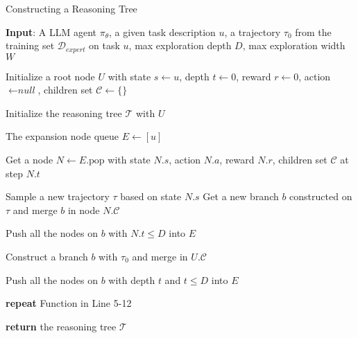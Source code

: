 \begin{algorithm*}[tb]
\caption{Constructing a Reasoning Tree}\label{algo:stage2}
\begin{algorithmic}
 \STATE \textbf{Input}: A LLM agent $\pi_\theta$, a given task description $u$, a trajectory $\tau_0$ from the training set $\mathcal{D}_{expert}$ on task $u$, max exploration depth $D$, max exploration width $W$
   
   \STATE Initialize a root node $U$ with state $s \gets u$, depth $t \gets 0$, reward $r \gets 0$, action $\gets \textit{null}$, children set $\mathcal{C} \gets \{\}$
   
   \STATE Initialize the reasoning tree $\mathcal{T}$ with $U$
   
   \STATE The expansion node queue $E \gets [u]$
   
      \STATE Get a node $N \gets E\text{.pop}$ with state $N.s$, action $N.a$, reward $N.r$, children set $\mathcal{C}$ at step $N.t$
      
         \STATE Sample a new trajectory $\tau$ based on state $N.s$
         \STATE Get a new branch $b$ constructed on $\tau$ and merge $b$ in node $N.\mathcal{C}$
         
            \STATE Push all the nodes on $b$ with $N.t \leq D$ into $E$
         \ENDIF
      \ENDIF
   \ENDWHILE
   
   \STATE Construct a branch $b$ with $\tau_0$ and merge in $U.\mathcal{C}$
   
   \STATE Push all the nodes on $b$ with depth $t$ and $t \leq D$ into $E$
   
   \STATE \textbf{repeat} Function in Line 5-12
   
   \STATE \textbf{return} the reasoning tree $\mathcal{T}$
   
\end{algorithmic}
\end{algorithm*}
